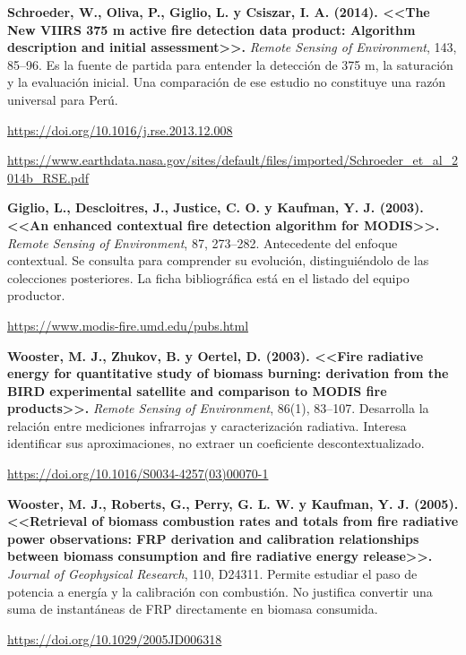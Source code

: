 \begin{enumerate}[label={[\arabic*]},ref=\arabic*,leftmargin=2.2em,itemsep=1em]
\item\label{src:schroeder2014} \textbf{Schroeder, W., Oliva, P., Giglio, L. y Csiszar, I. A.
(2014). <<The New VIIRS 375 m active fire detection data product: Algorithm description
and initial assessment>>.} \emph{Remote Sensing of Environment}, 143, 85--96.
Es la fuente de partida para entender la detección de 375 m, la saturación y la evaluación
inicial. Una comparación de ese estudio no constituye una razón universal para Perú.
\par\url{https://doi.org/10.1016/j.rse.2013.12.008}
\par\url{https://www.earthdata.nasa.gov/sites/default/files/imported/Schroeder_et_al_2014b_RSE.pdf}

\item\label{src:giglio2003} \textbf{Giglio, L., Descloitres, J., Justice, C. O. y Kaufman,
Y. J. (2003). <<An enhanced contextual fire detection algorithm for MODIS>>.}
\emph{Remote Sensing of Environment}, 87, 273--282. Antecedente del enfoque contextual.
Se consulta para comprender su evolución, distinguiéndolo de las colecciones posteriores.
La ficha bibliográfica está en el listado del equipo productor.
\par\url{https://www.modis-fire.umd.edu/pubs.html}

\item\label{src:wooster2003} \textbf{Wooster, M. J., Zhukov, B. y Oertel, D. (2003).
<<Fire radiative energy for quantitative study of biomass burning: derivation from the
BIRD experimental satellite and comparison to MODIS fire products>>.}
\emph{Remote Sensing of Environment}, 86(1), 83--107.
Desarrolla la relación entre mediciones infrarrojas y caracterización radiativa. Interesa
identificar sus aproximaciones, no extraer un coeficiente descontextualizado.
\par\url{https://doi.org/10.1016/S0034-4257(03)00070-1}

\item\label{src:wooster2005} \textbf{Wooster, M. J., Roberts, G., Perry, G. L. W. y Kaufman,
Y. J. (2005). <<Retrieval of biomass combustion rates and totals from fire radiative power
observations: FRP derivation and calibration relationships between biomass consumption
and fire radiative energy release>>.} \emph{Journal of Geophysical Research}, 110, D24311.
Permite estudiar el paso de potencia a energía y la calibración con combustión. No justifica
convertir una suma de instantáneas de FRP directamente en biomasa consumida.
\par\url{https://doi.org/10.1029/2005JD006318}


\end{enumerate}
